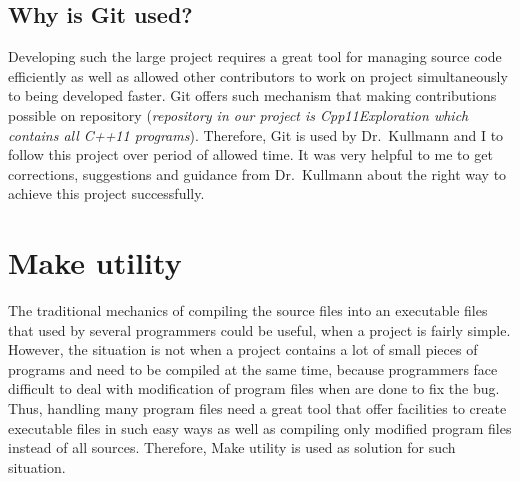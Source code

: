 \documentclass[11pt]{report}
\begin{document}
\begin{figure}[h]
\begin{center}
{\label{fig:gitstage}}
\end{center}
\end{figure}

\subsection{Why is Git used?}
\label{subsec: why git}
Developing such the large project requires a great tool for managing source code efficiently as well as allowed other contributors to work on project simultaneously to being developed faster. Git offers such mechanism that making contributions possible on repository (\emph{repository in our project is Cpp11Exploration which contains all C++11 programs}). Therefore, Git is used by Dr.~Kullmann and I to follow this project over period of allowed time. It was very helpful to me to get corrections, suggestions and guidance from Dr.~Kullmann about the right way to achieve this project successfully.

\section{Make utility}
\label{sec: Make}
The traditional mechanics of compiling the source files into an executable files that used by several programmers could be useful, when a project is fairly simple. However, the situation is not when a project contains a lot of small pieces of programs and need to be compiled at the same time, because programmers face difficult to deal with modification of program files when are done to fix the bug. Thus, handling many program files need a great tool that offer facilities to create executable files in such easy ways as well as compiling only modified program files instead of all sources. Therefore, Make utility is used as solution for such situation.
\end{document}
